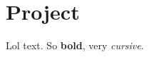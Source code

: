 \documentclass[Main]{subfiles}
\begin{document}
\section{Project} %
	\label{sec:project}

	Lol text.
	So \textbf{bold}, very \emph{cursive}.

\end{document}
